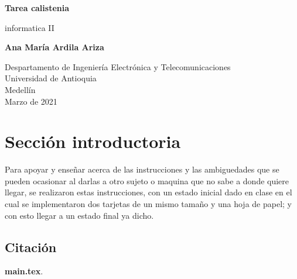 \documentclass{article}
\begin{document}
\begin{titlepage}
    \begin{center}
        \vspace*{1cm}
            
        \Huge
        \textbf{Tarea calistenia}
            
        \vspace{0.5cm}
        \LARGE
        informatica II
            
        \vspace{1.5cm}
            
        \textbf{Ana María Ardila Ariza}
            
        \vfill
            
        \vspace{0.8cm}
            
        \Large
        Despartamento de Ingeniería Electrónica y Telecomunicaciones\\
        Universidad de Antioquia\\
        Medellín\\
        Marzo de 2021
            
    \end{center}
\end{titlepage}

\tableofcontents
\newpage
\section{Sección introductoria}\label{intro}
Para apoyar y enseñar acerca de las instrucciones y las ambiguedades que se pueden ocasionar al darlas a otro sujeto o maquina que no sabe a donde quiere llegar, se realizaron estas instrucciones, con un estado inicial dado en clase en el cual se implementaron dos tarjetas de un mismo tamaño y una hoja de papel; y con esto llegar a un estado final ya dicho.

\subsection{Citación}
\textbf{main.tex}.
\end{document}
